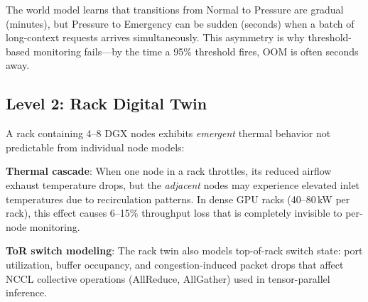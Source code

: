 \documentclass[conference,10pt]{IEEEtran}
\begin{document}
The world model learns that transitions from Normal to Pressure are gradual (minutes), but Pressure to Emergency can be sudden (seconds) when a batch of long-context requests arrives simultaneously. This asymmetry is why threshold-based monitoring fails---by the time a 95\% threshold fires, OOM is often seconds away.

\subsection{Level 2: Rack Digital Twin}

A rack containing 4--8 DGX nodes exhibits \emph{emergent} thermal behavior not predictable from individual node models:

\textbf{Thermal cascade}: When one node in a rack throttles, its reduced airflow exhaust temperature drops, but the \emph{adjacent} nodes may experience elevated inlet temperatures due to recirculation patterns. In dense GPU racks (40--80\,kW per rack), this effect causes 6--15\% throughput loss that is completely invisible to per-node monitoring.

\begin{table}[!htbp]
\caption{Rack-Level Thermal Cascade Analysis (DGX B200, 4-node rack)}
\label{tab:thermal}
\centering\scriptsize
{}
\end{table}

\textbf{ToR switch modeling}: The rack twin also models top-of-rack switch state: port utilization, buffer occupancy, and congestion-induced packet drops that affect NCCL collective operations (AllReduce, AllGather) used in tensor-parallel inference.
\end{document}

